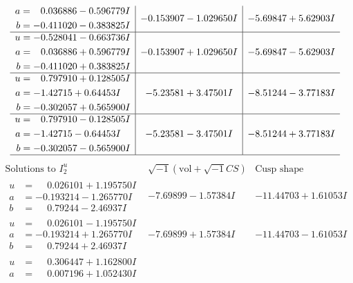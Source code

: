 \documentclass[1p]{elsarticle_modified}
\theoremstyle{definition}
\newcommand{\I}{\sqrt{-1}}
\begin{document}
$$\begin{array}{c|c|c}
\begin{aligned}
a &= \phantom{-}0.036886 - 0.596779 I \\
b &= -0.411020 - 0.383825 I\end{aligned}
 & -0.153907 - 1.029650 I & -5.69847 + 5.62903 I \\ \hline\begin{aligned}
u &= -0.528041 - 0.663736 I \\
a &= \phantom{-}0.036886 + 0.596779 I \\
b &= -0.411020 + 0.383825 I\end{aligned}
 & -0.153907 + 1.029650 I & -5.69847 - 5.62903 I \\ \hline\begin{aligned}
u &= \phantom{-}0.797910 + 0.128505 I \\
a &= -1.42715 + 0.64453 I \\
b &= -0.302057 + 0.565900 I\end{aligned}
 & -5.23581 + 3.47501 I & -8.51244 - 3.77183 I \\ \hline\begin{aligned}
u &= \phantom{-}0.797910 - 0.128505 I \\
a &= -1.42715 - 0.64453 I \\
b &= -0.302057 - 0.565900 I\end{aligned}
 & -5.23581 - 3.47501 I & -8.51244 + 3.77183 I\\
 \hline 
 \end{array}$$\newpage$$\begin{array}{c|c|c}  
\text{Solutions to }I^u_{2}& \I (\text{vol} + \sqrt{-1}CS) & \text{Cusp shape}\\
 \hline 
\begin{aligned}
u &= \phantom{-}0.026101 + 1.195750 I \\
a &= -0.193214 - 1.265770 I \\
b &= \phantom{-}0.79244 - 2.46937 I\end{aligned}
 & -7.69899 - 1.57384 I & -11.44703 + 1.61053 I \\ \hline\begin{aligned}
u &= \phantom{-}0.026101 - 1.195750 I \\
a &= -0.193214 + 1.265770 I \\
b &= \phantom{-}0.79244 + 2.46937 I\end{aligned}
 & -7.69899 + 1.57384 I & -11.44703 - 1.61053 I \\ \hline\begin{aligned}
u &= \phantom{-}0.306447 + 1.162800 I \\
a &= \phantom{-}0.007196 + 1.052430 I \\

\end{aligned}
\end{array}$$
\end{document}
